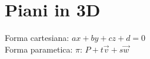 \section{Piani in 3D}

Forma cartesiana: $ax + by + cz + d = 0$ \\
Forma parametica: $\pi \text{: } P+t\overrightarrow{v}+s\overrightarrow{w}$ \\
